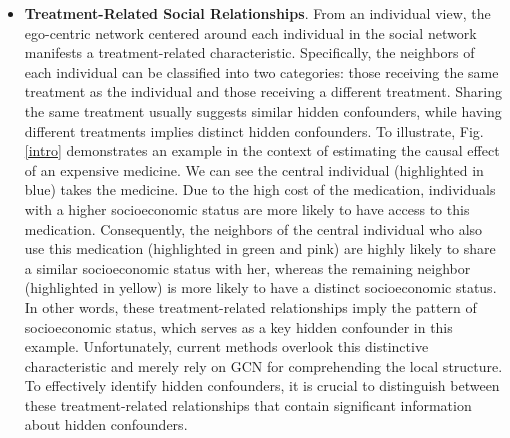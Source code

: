 \documentclass[twoside,leqno,twocolumn]{article}
\begin{document}
\begin{itemize}[leftmargin=*,topsep=0pt,parsep=0pt]
\vspace{0mm}
\item \textbf{Treatment-Related Social Relationships}. From an individual view, the ego-centric network \cite{arnaboldi2017online} centered around each individual in the social network manifests a treatment-related characteristic.
Specifically, the neighbors of each individual can be classified into two categories: those receiving the same treatment as the individual and those receiving a different treatment.
Sharing the same treatment usually suggests similar hidden confounders, while having different treatments implies distinct hidden confounders.
To illustrate, Fig. \ref{intro} demonstrates an example in the context of estimating the causal effect of an expensive medicine. We can see the central individual (highlighted in blue) takes the medicine. 
Due to the high cost of the medication, 
individuals with a higher socioeconomic status are more likely to have access to this medication.
Consequently, the neighbors of the central individual who also use this medication (highlighted in green and pink) are highly likely to share a similar socioeconomic status with her, whereas the remaining neighbor (highlighted in yellow) is more likely to have a distinct socioeconomic status.
In other words, these treatment-related relationships imply the pattern of socioeconomic status, which serves as a key hidden confounder in this example. 
Unfortunately, current methods overlook this distinctive characteristic and merely rely on GCN for comprehending the local structure.
To effectively identify hidden confounders, it is crucial to distinguish between these treatment-related relationships that contain significant information about hidden confounders.
\end{itemize} 
\end{document}
